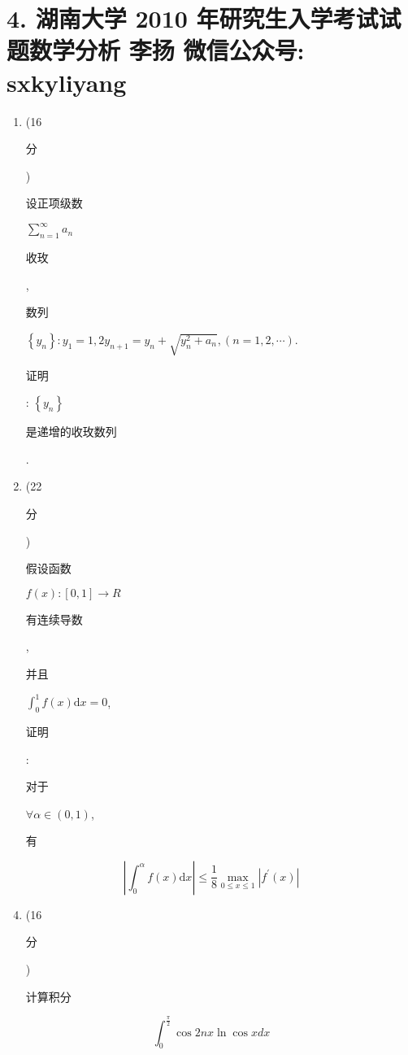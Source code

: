 \documentclass[10pt]{article}
\begin{document}
\section{4. 湖南大学 2010 年研究生入学考试试题数学分析 
 李扬 
 微信公众号: sxkyliyang}
\begin{enumerate}
  \item (16 \begin{CJK}{UTF8}{mj}分\end{CJK}) \begin{CJK}{UTF8}{mj}设正项级数\end{CJK} $\sum_{n=1}^{\infty} a_{n}$ \begin{CJK}{UTF8}{mj}收玫\end{CJK}, \begin{CJK}{UTF8}{mj}数列\end{CJK} $\left\{y_{n}\right\}: y_{1}=1,2 y_{n+1}=y_{n}+\sqrt{y_{n}^{2}+a_{n}},(n=1,2, \cdots)$. \begin{CJK}{UTF8}{mj}证明\end{CJK}: $\left\{y_{n}\right\}$ \begin{CJK}{UTF8}{mj}是递增的收玫数列\end{CJK}.

  \item (22 \begin{CJK}{UTF8}{mj}分\end{CJK}) \begin{CJK}{UTF8}{mj}假设函数\end{CJK} $f(x):[0,1] \rightarrow R$ \begin{CJK}{UTF8}{mj}有连续导数\end{CJK}, \begin{CJK}{UTF8}{mj}并且\end{CJK} $\int_{0}^{1} f(x) \mathrm{d} x=0$, \begin{CJK}{UTF8}{mj}证明\end{CJK}: \begin{CJK}{UTF8}{mj}对于\end{CJK} $\forall \alpha \in(0,1)$, \begin{CJK}{UTF8}{mj}有\end{CJK}

\end{enumerate}
$$
\left|\int_{0}^{\alpha} f(x) \mathrm{d} x\right| \leqslant \frac{1}{8} \max _{0 \leqslant x \leqslant 1}\left|f^{\prime}(x)\right|
$$

\begin{enumerate}
  \setcounter{enumi}{3}
  \item (16 \begin{CJK}{UTF8}{mj}分\end{CJK}) \begin{CJK}{UTF8}{mj}计算积分\end{CJK}
\end{enumerate}
$$
\int_{0}^{\frac{\pi}{2}} \cos 2 n x \ln \cos x d x
$$
\end{document}

